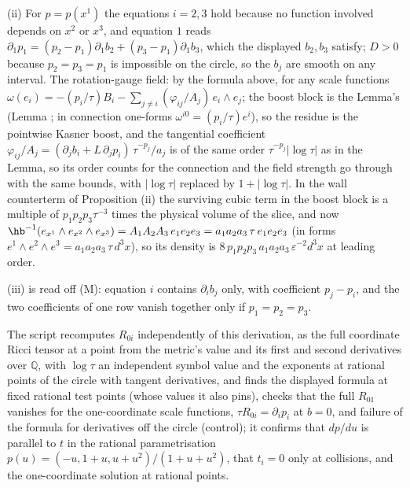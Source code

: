 (ii) For $p = p(x^{1})$ the equations $i = 2, 3$ hold because no function involved depends on $x^{2}$ or $x^{3}$, and equation $1$ reads $\partial_{1}p_{1} = (p_{2} - p_{1})\partial_{1}b_{2} + (p_{3} - p_{1})\partial_{1}b_{3}$, which the displayed $b_{2}, b_{3}$ satisfy; $D > 0$ because $p_{2} = p_{3} = p_{1}$ is impossible on the circle, so the $b_{j}$ are smooth on any interval. The rotation-gauge field: by the formula above, for any scale functions $\omega(e_{i}) = -(p_{i}/\tau)B_{i} - \sum_{j \neq i}(\varphi_{ij}/A_{j})\,e_{i}\wedge e_{j}$; the boost block is the Lemma's (Lemma ; in connection one-forms $\omega^{i0} = (p_{i}/\tau)e^{i}$), so the residue is the pointwise Kasner boost, and the tangential coefficient $\varphi_{ij}/A_{j} = (\partial_{j}b_{i} + L\,\partial_{j}p_{i})\,\tau^{-p_{j}}/a_{j}$ is of the same order $\tau^{-p_{j}}|\log\tau|$ as in the Lemma, so its order counts for the connection and the field strength go through with the same bounds, with $|\log\tau|$ replaced by $1 + |\log\tau|$. In the wall counterterm of Proposition (ii) the surviving cubic term in the boost block is a multiple of $p_{1}p_{2}p_{3}\tau^{-3}$ times the physical volume of the slice, and now $\hb^{-1}(e_{x^{1}}\wedge e_{x^{2}}\wedge e_{x^{3}}) = A_{1}A_{2}A_{3}\,e_{1}e_{2}e_{3} = a_{1}a_{2}a_{3}\,\tau\,e_{1}e_{2}e_{3}$ (in forms $e^{1}\wedge e^{2}\wedge e^{3} = a_{1}a_{2}a_{3}\,\tau\,d^{3}x$), so its density is $8\,p_{1}p_{2}p_{3}\,a_{1}a_{2}a_{3}\,\varepsilon^{-2}d^{3}x$ at leading order.

(iii) is read off (M): equation $i$ contains $\partial_{i}b_{j}$ only, with coefficient $p_{j} - p_{i}$, and the two coefficients of one row vanish together only if $p_{1} = p_{2} = p_{3}$.

The script recomputes $R_{0i}$ independently of this derivation, as the full coordinate Ricci tensor at a point from the metric's value and its first and second derivatives over $\mathbb{Q}$, with $\log\tau$ an independent symbol value and the exponents at rational points of the circle with tangent derivatives, and finds the displayed formula at fixed rational test points (whose values it also pins), checks that the full $R_{01}$ vanishes for the one-coordinate scale functions, $\tau R_{0i} = \partial_{i}p_{i}$ at $b = 0$, and failure of the formula for derivatives off the circle (control); it confirms that $dp/du$ is parallel to $t$ in the rational parametrisation $p(u) = (-u, 1 + u, u + u^{2})/(1 + u + u^{2})$, that $t_{i} = 0$ only at collisions, and the one-coordinate solution at rational points.

